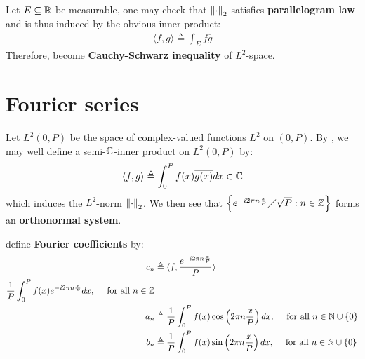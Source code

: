 \documentclass{report}
\begin{document}
Let $E \subseteq \mathbb{R}$ be measurable, one may check that $\left\| \cdot \right\|_2$ satisfies  \textbf{parallelogram law} and is thus induced by the obvious inner product: 
\begin{align*}
\langle f,g\rangle \triangleq \int_E f\overline{g}
\end{align*}
Therefore,  become \textbf{Cauchy-Schwarz inequality} of $L^2$-space.  
\section{Fourier series}
Let $L^2(0,P)$ be the space of complex-valued functions $L^2$ on  $(0,P)$. By , we may well define a semi-$\mathbb{C}$-inner product on $L^2(0,P)$ by: 
\begin{align*}
\langle f,g\rangle \triangleq  \int_0^P f(x)\overline{g(x)}dx \in\mathbb{C}
\end{align*}
which induces the $L^2$-norm  $\left\| \cdot \right\|_2$. We then see that $\left\{ e^{-i 2\pi  n \frac{x}{P}}\diagup \sqrt{P}  : n\in\mathbb{Z}  \right\}$ forms an \textbf{orthonormal system}.



define \textbf{Fourier coefficients} by: 
\begin{align*}
  c_n &\triangleq \langle f, \frac{e^{-i 2\pi  n \frac{x}{P}}}{P}\rangle \\
  \frac{1}{P}\int_0^P f(x) e^{-i  2\pi  n \frac{x}{P}}  dx,\quad \text{ for all } n\in\mathbb{Z} \\
  a_n&\triangleq  \frac{1}{P}\int_0^P f(x) \cos \left( 2\pi  n \frac{x}{P} \right) dx,\quad \text{ for all }n \in\mathbb{N} \cup \left\{ 0 \right\}  \\
  b_n&\triangleq  \frac{1}{P}\int_0^P f(x) \sin \left( 2\pi  n \frac{x}{P} \right) dx,\quad \text{ for all }n \in\mathbb{N} \cup \left\{ 0 \right\}  
\end{align*}
\end{document}
